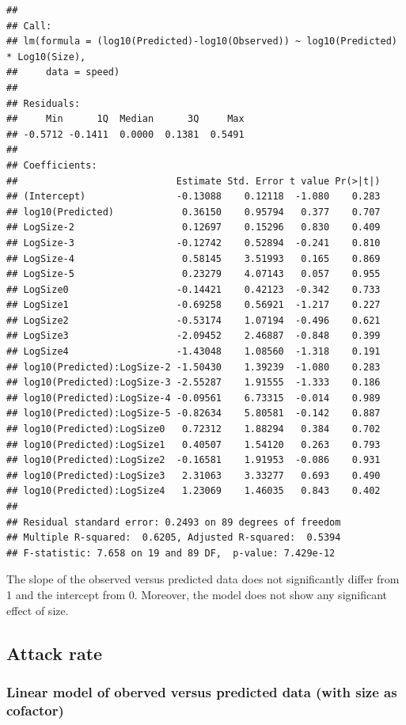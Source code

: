 \documentclass[utf8, 12 pt]{frontiers_suppmat}
\begin{document}
\begin{verbatim}
## 
## Call:
## lm(formula = (log10(Predicted)-log10(Observed)) ~ log10(Predicted) * Log10(Size), 
##     data = speed)
## 
## Residuals:
##     Min      1Q  Median      3Q     Max 
## -0.5712 -0.1411  0.0000  0.1381  0.5491 
## 
## Coefficients:
##                            Estimate Std. Error t value Pr(>|t|)
## (Intercept)                -0.13088    0.12118  -1.080    0.283
## log10(Predicted)            0.36150    0.95794   0.377    0.707
## LogSize-2                   0.12697    0.15296   0.830    0.409
## LogSize-3                  -0.12742    0.52894  -0.241    0.810
## LogSize-4                   0.58145    3.51993   0.165    0.869
## LogSize-5                   0.23279    4.07143   0.057    0.955
## LogSize0                   -0.14421    0.42123  -0.342    0.733
## LogSize1                   -0.69258    0.56921  -1.217    0.227
## LogSize2                   -0.53174    1.07194  -0.496    0.621
## LogSize3                   -2.09452    2.46887  -0.848    0.399
## LogSize4                   -1.43048    1.08560  -1.318    0.191
## log10(Predicted):LogSize-2 -1.50430    1.39239  -1.080    0.283
## log10(Predicted):LogSize-3 -2.55287    1.91555  -1.333    0.186
## log10(Predicted):LogSize-4 -0.09561    6.73315  -0.014    0.989
## log10(Predicted):LogSize-5 -0.82634    5.80581  -0.142    0.887
## log10(Predicted):LogSize0   0.72312    1.88294   0.384    0.702
## log10(Predicted):LogSize1   0.40507    1.54120   0.263    0.793
## log10(Predicted):LogSize2  -0.16581    1.91953  -0.086    0.931
## log10(Predicted):LogSize3   2.31063    3.33277   0.693    0.490
## log10(Predicted):LogSize4   1.23069    1.46035   0.843    0.402
## 
## Residual standard error: 0.2493 on 89 degrees of freedom
## Multiple R-squared:  0.6205, Adjusted R-squared:  0.5394 
## F-statistic: 7.658 on 19 and 89 DF,  p-value: 7.429e-12
\end{verbatim}
The slope of the observed versus predicted data does not significantly differ from 1 and the intercept from 0. Moreover, the model does not show any significant effect of size.
\par
\vspace{0.3 cm}

\hypertarget{attack-rate}{%
\subsection{Attack rate}\label{attack-rate}}

\hypertarget{linear-model-of-oberved-versus-predicted-data-with-size-as-cofactor}{%
\subsubsection{Linear model of oberved versus predicted data (with size
as
cofactor)}\label{linear-model-of-oberved-versus-predicted-data-with-size-as-cofactor}}
\end{document}
